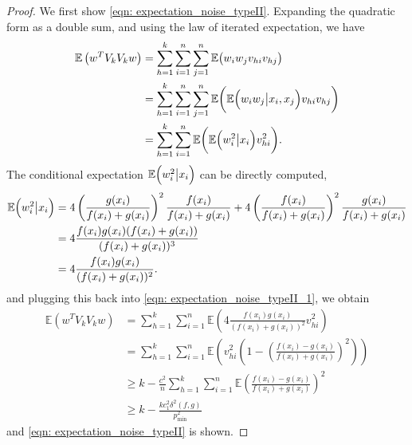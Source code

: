 \documentclass{article}
\newcommand{\1}{\mathbb{I}}
\newcommand{\Ebb}{\mathbb{E}}
\theoremstyle{alden}
\theoremstyle{aldenthm}
\theoremstyle{definition}
\theoremstyle{remark}
\begin{document}
\begin{proof}
	We first show \eqref{eqn: expectation_noise_typeII}. Expanding the quadratic form as a double sum, and using the law of iterated expectation, we have
	\begin{align}
	\label{eqn: expectation_noise_typeII_1}
	\Ebb \left( w^T V_k V_k w\right) & = \sum_{h = 1}^{k} \sum_{i = 1}^{n} \sum_{j = 1}^n \Ebb \bigl(w_i w_j v_{hi} v_{hj} \bigr) \nonumber \\
	& = \sum_{h = 1}^{k} \sum_{i = 1}^{n} \sum_{j = 1}^n \Ebb \biggl( \Ebb\Bigl(w_i w_j \bigl\vert x_i, x_j\Bigr) v_{hi} v_{hj}\biggr) \nonumber \\
	& = \sum_{h = 1}^{k} \sum_{i = 1}^{n} \Ebb \biggl( \Ebb\Bigl(w_i^2 \bigl\vert x_i\Bigr) v_{hi}^2\biggr).
	\end{align}
	The conditional expectation $\Ebb\Bigl(w_i^2 \bigl\vert x_i\Bigr)$ can be directly computed,
	\begin{align*}
	\Ebb\Bigl(w_i^2 \bigl\vert x_i\Bigr) & = 4\left(\frac{g(x_i)}{f(x_i) + g(x_i)}\right)^2 \frac{f(x_i)}{f(x_i) + g(x_i)} + 4\left(\frac{f(x_i)}{f(x_i) + g(x_i)}\right)^2 \frac{g(x_i)}{f(x_i) + g(x_i)} \\
	& = 4 \frac{f(x_i)g(x_i)(f(x_i) + g(x_i))}{(f(x_i) + g(x_i))^3} \\
	& = 4 \frac{f(x_i)g(x_i)}{(f(x_i) + g(x_i))^2}.
	\end{align*}
	and plugging this back into \eqref{eqn: expectation_noise_typeII_1}, we obtain
	\begin{align*}
	\Ebb \left( w^T V_k V_k w\right) & = \sum_{h = 1}^{k} \sum_{i = 1}^{n} \Ebb \left(4 \frac{f(x_i) g(x_i)}{(f(x_i) + g(x_i))^2} v_{hi}^2\right) \\
	& = \sum_{h = 1}^{k} \sum_{i = 1}^{n} \Ebb \left(v_{hi}^2 \left(1 - \left(\frac{f(x_i) - g(x_i)}{f(x_i) + g(x_i)} \right)^2 \right)\right) \\
	& \geq k - \frac{c^2}{n}\sum_{h = 1}^{k} \sum_{i = 1}^{n} \Ebb \left(\frac{f(x_i) - g(x_i)}{f(x_i) + g(x_i)} \right)^2 \\
	& \geq k - \frac{kc_1^2 \delta^2(f,g)}{p_{\min}^2}
	\end{align*}
	and \eqref{eqn: expectation_noise_typeII} is shown.
	

\end{proof}
\end{document}
